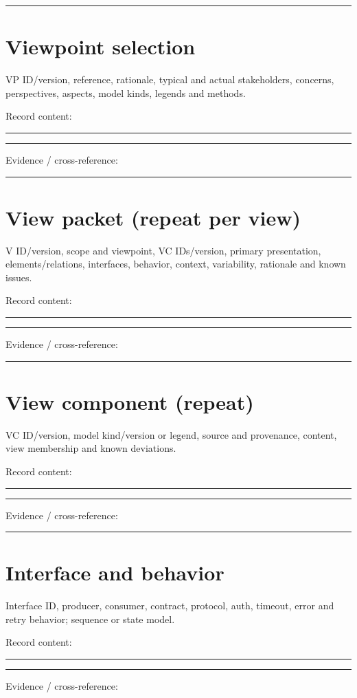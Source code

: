 \documentclass[11pt,letterpaper]{article}
\newcommand{\docsection}[1]{\Needspace{5\baselineskip}\section{#1}}
\begin{document}
\noindent\rule{\linewidth}{0.35pt}\par
\docsection{Viewpoint selection}
VP ID/version, reference, rationale, typical and actual stakeholders, concerns, perspectives, aspects, model kinds, legends and methods.

Record content:

\noindent\rule{\linewidth}{0.35pt}\par\vspace{0.7em}
\noindent\rule{\linewidth}{0.35pt}\par\vspace{0.7em}
Evidence / cross-reference:

\noindent\rule{\linewidth}{0.35pt}\par
\docsection{View packet (repeat per view)}
V ID/version, scope and viewpoint, VC IDs/version, primary presentation, elements/relations, interfaces, behavior, context, variability, rationale and known issues.

Record content:

\noindent\rule{\linewidth}{0.35pt}\par\vspace{0.7em}
\noindent\rule{\linewidth}{0.35pt}\par\vspace{0.7em}
Evidence / cross-reference:

\noindent\rule{\linewidth}{0.35pt}\par
\docsection{View component (repeat)}
VC ID/version, model kind/version or legend, source and provenance, content, view membership and known deviations.

Record content:

\noindent\rule{\linewidth}{0.35pt}\par\vspace{0.7em}
\noindent\rule{\linewidth}{0.35pt}\par\vspace{0.7em}
Evidence / cross-reference:

\noindent\rule{\linewidth}{0.35pt}\par
\docsection{Interface and behavior}
Interface ID, producer, consumer, contract, protocol, auth, timeout, error and retry behavior; sequence or state model.

Record content:

\noindent\rule{\linewidth}{0.35pt}\par\vspace{0.7em}
\noindent\rule{\linewidth}{0.35pt}\par\vspace{0.7em}
Evidence / cross-reference:
\end{document}
